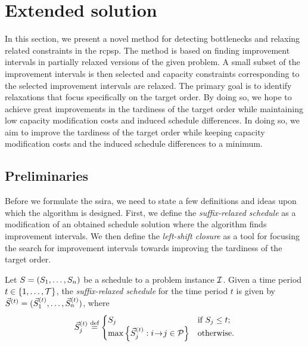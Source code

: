 \section{Extended solution} \label{sec:solution-apporach/extended-solution}

In this section, we present a novel method for detecting bottlenecks
and relaxing related constraints in the \ac{rcpsp}.
The method is based on finding improvement intervals
in partially relaxed versions of the given problem.
A small subset of the improvement intervals is then selected and capacity constraints
corresponding to the selected improvement intervals are relaxed.
The primary goal is to identify relaxations that focus specifically on the target order.
By doing so, we hope to achieve great improvements in the tardiness of the target order
while maintaining low capacity modification costs and induced schedule differences.
In doing so, we aim to improve the tardiness of the target order
while keeping capacity modification costs and the induced schedule differences to a minimum.

\subsection{Preliminaries} \label{subsec:solution-approach/extended-solutin/preliminaries}

Before we formulate the \acl{ssira},
we need to state a few definitions and ideas upon which the algorithm is designed.
First, we define the \emph{suffix-relaxed schedule} as a modification of an obtained schedule solution
where the algorithm finds improvement intervals.
We then define the \emph{left-shift closure} as a tool
for focusing the search for improvement intervals towards improving the tardiness of the target order.

\begin{defn} \label{def:suffix-relaxed-schedule}
    Let $S = (S_{1}, \dots, S_{n})$ be a schedule to a problem instance $\mathcal{I}$.
    Given a time period $t \in \{{1}, \dots, {\mathcal{T}}\}$,
    the \emph{suffix-relaxed schedule} for the time period $t$ is given by
    $\vec{S}^{(t)} = (\vec{S}^{(t)}_{1}, \dots, \vec{S}^{(t)}_{n})$, where
    $$
    \vec{S}^{(t)}_{j} \overset{\text{def}}{=} \begin{cases}
        S_{j} & \text{if $S_{j} \leq t$;} \\
        \max\left\{\vec{S}^{(t)}_{j} : i \hspace{-0.2em} \rightarrow \hspace{-0.2em} j \in \mathcal{P} \right\} & \text{otherwise.}
    \end{cases}
    $$
\end{defn}

